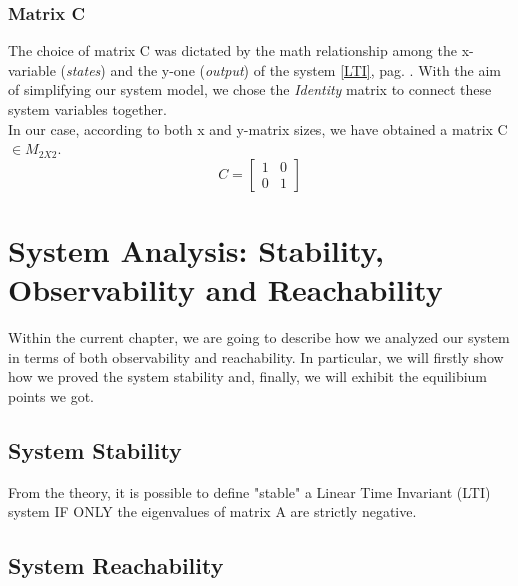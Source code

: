 \documentclass[a4paper,12pt,titlepage]{report}
\begin{document}
	\subsection{Matrix C}
	The choice of matrix C was dictated by the math relationship among the x-variable (\textit{states}) and the y-one (\textit{output}) of the system \ref{LTI}, pag. \pageref{LTI}. With the aim of simplifying our system model, we chose the \textit{Identity} matrix to connect these system variables together. \\ In our case, according to both x and y-matrix sizes, we have obtained a matrix C $\in M_{2X2}$.
		\begin{equation}
		C = 
		\begin{bmatrix}
			1 & 0 \\
			0 & 1
		\end{bmatrix}
		\end{equation}
\chapter{System Analysis: Stability, Observability and Reachability}
	Within the current chapter, we are going to describe how we analyzed our system in terms of both observability and reachability. In particular, we will firstly show how we proved the system stability and, finally, we will exhibit the equilibium points we got.
\section{System Stability} 
	From the theory, it is possible to define "stable" a Linear Time Invariant (LTI) system IF ONLY the eigenvalues of matrix A are strictly negative.
\section{System Reachability}
\end{document}
